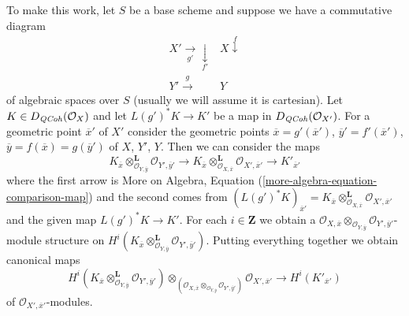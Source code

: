 \medskip\noindent
To make this work, let $S$ be a base scheme and
suppose we have a commutative diagram
$$
\begin{array}{cc}X' \underset{g'}{\longrightarrow}\underset{f'}{\downarrow} & X \overset{f}{\downarrow} \\ Y' \overset{g}{\longrightarrow} & Y\end{array}
$$
of algebraic spaces over $S$ (usually we will assume it is cartesian).
Let $K \in D_{\mathit{QCoh}}(\mathcal{O}_X)$
and let $L(g')^*K \to K'$ be a map in $D_{\mathit{QCoh}}(\mathcal{O}_{X'})$.
For a geometric point $\overline{x}'$ of $X'$ consider the geometric
points
$\overline{x} = g'(\overline{x}')$,
$\overline{y}' = f'(\overline{x}')$,
$\overline{y} = f(\overline{x}) = g(\overline{y}')$
of $X$, $Y'$, $Y$.
Then we can consider the maps
$$
K_{\overline{x}}
\otimes_{\mathcal{O}_{Y, \overline{y}}}^\mathbf{L}
\mathcal{O}_{Y', \overline{y}'}
\to
K_{\overline{x}}
\otimes_{\mathcal{O}_{X, \overline{x}}}^\mathbf{L}
\mathcal{O}_{X', \overline{x}'} \to
K'_{\overline{x}'}
$$
where the first arrow is More on Algebra,
Equation (\ref{more-algebra-equation-comparison-map})
and the second comes from
$(L(g')^*K)_{\overline{x}'} =
K_{\overline{x}} \otimes_{\mathcal{O}_{X, \overline{x}}}^\mathbf{L}
\mathcal{O}_{X', \overline{x}'}$
and the given map $L(g')^*K \to K'$.
For each $i \in \mathbf{Z}$ we obtain a
$\mathcal{O}_{X, \overline{x}} \otimes_{\mathcal{O}_{Y, \overline{y}}}
\mathcal{O}_{Y', \overline{y}'}$-module structure on
$H^i(K_{\overline{x}}
\otimes_{\mathcal{O}_{Y, \overline{y}}}^\mathbf{L}
\mathcal{O}_{Y', \overline{y}'})$.
Putting everything together we obtain canonical maps
\begin{equation}
\label{equation-bc}
H^i(K_{\overline{x}}
\otimes_{\mathcal{O}_{Y, \overline{y}}}^\mathbf{L}
\mathcal{O}_{Y', \overline{y}'})
\otimes_{(\mathcal{O}_{X, \overline{x}}
\otimes_{\mathcal{O}_{Y, \overline{y}}}
\mathcal{O}_{Y', \overline{y}'})}
\mathcal{O}_{X', \overline{x}'}
\longrightarrow
H^i(K'_{\overline{x}'})
\end{equation}
of $\mathcal{O}_{X', \overline{x}'}$-modules.


